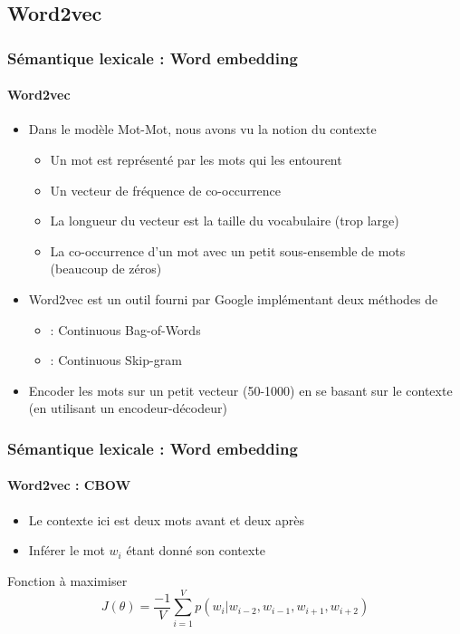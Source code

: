\documentclass[xcolor=table]{beamer}
\begin{document}
\subsection{Word2vec}

\begin{frame}
\frametitle{Sémantique lexicale : Word embedding}
\framesubtitle{Word2vec}

\begin{itemize}
	\item Dans le modèle Mot-Mot, nous avons vu la notion du contexte 
	\begin{itemize}
		\item Un mot est représenté par les mots qui les entourent
		\item Un vecteur de fréquence de co-occurrence
		\item La longueur du vecteur est la taille du vocabulaire (trop large)
		\item La co-occurrence d'un mot avec un petit sous-ensemble de mots (beaucoup de zéros)
	\end{itemize}
	\item Word2vec est un outil fourni par Google implémentant deux méthodes de  \cite{2013-mikolov-al}
	\begin{itemize}
		\item {} : Continuous Bag-of-Words
		\item {} : Continuous Skip-gram
	\end{itemize}
	\item Encoder les mots sur un petit vecteur (50-1000) en se basant sur le contexte (en utilisant un encodeur-décodeur)
\end{itemize}

\end{frame}

\begin{frame}
	\frametitle{Sémantique lexicale : Word embedding}
	\framesubtitle{Word2vec : CBOW}
\begin{minipage}{.58\textwidth}
	\begin{itemize}
		\item Le contexte ici est deux mots avant et deux après
		\item Inférer le mot $w_i$ étant donné son contexte
	\end{itemize}
	\begin{block}{Fonction à maximiser}
		\[%
		J(\theta) = \frac{-1}{V} \sum_{i=1}^{V} p(w_i |w_{i-2}, w_{i-1}, w_{i+1}, w_{i+2})
		\]
	\end{block}
\end{minipage}
\begin{minipage}{.08\textwidth}
\end{minipage}	
\begin{minipage}{.4\textwidth}
\end{minipage}
	
\end{frame}
\end{document}
